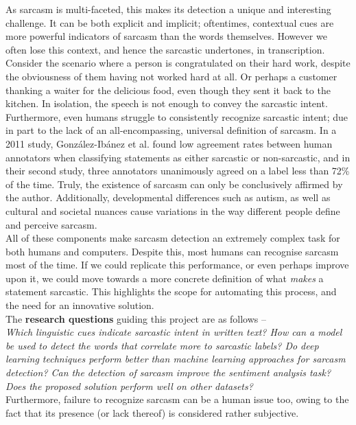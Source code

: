 \documentclass[12pt,a4paper]{article}
\begin{document}
\noindent As sarcasm is multi-faceted, this makes its detection a unique and interesting challenge. It can be both explicit and implicit; oftentimes, contextual cues are more powerful indicators of sarcasm than the words themselves. However we often lose this context, and hence the sarcastic undertones, in transcription. Consider the scenario where a person is congratulated on their hard work, despite the obviousness of them having not worked hard at all. Or perhaps a customer thanking a waiter for the delicious food, even though they sent it back to the kitchen. In isolation, the speech is not enough to convey the sarcastic intent. Furthermore, even humans struggle to consistently recognize sarcastic intent; due in part to the lack of an all-encompassing, universal definition of sarcasm. In a 2011 study, Gonz{\'a}lez-Ib{\'a}nez et al. \cite{gonzalez2011identifying} found low agreement rates between human annotators when classifying statements as either sarcastic or non-sarcastic, and in their second study, three annotators unanimously agreed on a label less than 72\% of the time. Truly, the existence of sarcasm can only be conclusively affirmed by the author. Additionally, developmental differences such as autism, as well as cultural and societal nuances cause variations in the way different people define and perceive sarcasm.\\


All of these components make sarcasm detection an extremely complex task for both humans and computers. Despite this, most humans can recognise sarcasm most of the time. If we could replicate this performance, or even perhaps improve upon it, we could move towards a more concrete definition of what \textit{makes} a statement sarcastic. This highlights the scope for automating this process, and the need for an innovative solution.\\


\noindent The \textbf{research questions} guiding this project are as follows --
\\ \indent \textit{Which linguistic cues indicate sarcastic intent in written text? How can a model be used to detect the words that correlate more to sarcastic labels? Do deep learning techniques perform better than machine learning approaches for sarcasm detection? Can the detection of sarcasm improve the sentiment analysis task? Does the proposed solution perform well on other datasets?}\\

Furthermore, failure to recognize sarcasm can be a human issue too, owing to the fact that its presence (or lack thereof) is considered rather subjective.
\end{document}
